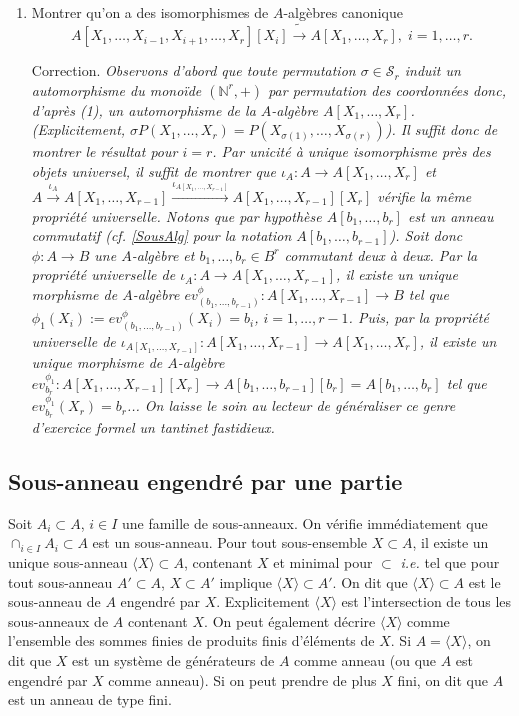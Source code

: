 \documentclass[a4paper, 12pt]{amsart}
\newcommand{\N}{\mathbb{N}}
\begin{document}
\begin{enumerate}[leftmargin=* ,parsep=0cm,itemsep=0cm,topsep=0cm]
\item Montrer qu'on a des isomorphismes de $A$-algèbres canonique $$  A[X_1,\dots,X_{i-1},X_{i+1},\dots, X_r][X_i]\tilde{\rightarrow} A[X_1,\dots,X_r],\; i=1,\dots, r.$$

 \noindent  Correction. \textit{Observons d'abord que toute permutation $\sigma\in \mathcal{S}_r$ induit un automorphisme du monoïde $(\N^r,+)$ par permutation des coordonnées donc, d'après (1), un automorphisme de la $A$-algèbre $A[X_1,\dots, X_r]$. (Explicitement, $\sigma P(X_1,\dots, X_r)=P(X_{\sigma(1)},\dots, X_{\sigma(r)})$). Il suffit donc de montrer le résultat pour $i=r$. Par unicité  à unique isomorphisme près des objets universel, il suffit de montrer que 
$\iota_A:A\rightarrow A[X_1,\dots, X_r]$ et $A\stackrel{\iota_A}{\rightarrow} A[X_1,\dots, X_{r-1}]\stackrel{\iota_{A[X_1,\dots, X_{r-1}]}}{\rightarrow} A[X_1,\dots, X_{r-1}][X_r]$ vérifie la même propriété universelle. Notons que par hypothèse  $A[b_1,\dots ,b_r]$ est un anneau commutatif (\textit{cf.} \ref{SousAlg} pour la notation $A[b_1,\dots, b_{r-1}]$). Soit donc $\phi:A\rightarrow B$ une $A$-algèbre et $b_1,\dots, b_r\in B^r$ commutant deux à deux. Par la propriété universelle de $\iota_A:A\rightarrow A[X_1,\dots, X_{r-1}]$, il existe un unique morphisme de $A$-algèbre $ev_{(b_1,\dots, b_{r-1})}^\phi:A[X_1,\dots,X_{r-1}]\rightarrow B$ tel que $\phi_1(X_i):=ev_{(b_1,\dots, b_{r-1})}^\phi(X_i)=b_i$, $i=1,\dots, r-1$. Puis, par la propriété universelle de $\iota_{A[X_1,\dots, X_{r-1}]}:A[X_1,\dots, X_{r-1}]\rightarrow A[X_1,\dots, X_r]$, il existe un unique morphisme de $A$-algèbre $ev_{b_r}^{\phi_1}:A[X_1,\dots,X_{r-1}][X_r]\rightarrow A[b_1,\dots ,b_{r-1}][b_r]=A[b_1,\dots,b_r]$ tel que $ev_{b_r}^{\phi_1}(X_r)=b_r$... On laisse le soin au lecteur de généraliser ce genre d'exercice formel un tantinet fastidieux.} \\
 
  \end{enumerate}
 
 

 
  \subsection{Sous-anneau engendré par une partie} Soit  $A_i\subset A$, $i\in I$ une famille de sous-anneaux. On vérifie immédiatement que $\cap_{i\in I}A_i\subset A$ est un sous-anneau. Pour tout sous-ensemble $X\subset A$, il existe 
un unique sous-anneau $\langle X\rangle \subset A$, contenant $X$ et minimal pour $\subset$ \textit{i.e.} tel que pour  tout sous-anneau $A'\subset A$,   $X\subset A'$ implique  $\langle X\rangle\subset A'$. On dit que $\langle X\rangle\subset A$ est le sous-anneau de $A$ engendré par $X$.  Explicitement $\langle X\rangle$ est l'intersection de tous les sous-anneaux de $A$ contenant $X$. On peut également décrire $\langle X\rangle$ comme  l'ensemble des sommes finies de produits finis d'éléments de $X$. Si $A=\langle X\rangle$, on dit que $X$ est un système de générateurs de $A$ comme anneau (ou que $A$ est engendré par $X$ comme anneau). Si on peut prendre de plus $X$ fini, on dit que $A$ est un anneau de type fini.\\
\end{document}
